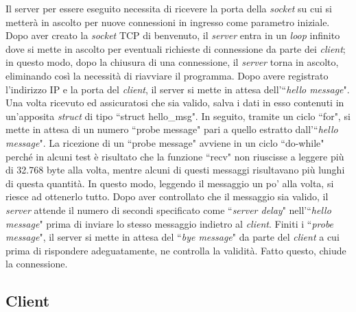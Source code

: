 \documentclass[a4paper, 12pt]{report}
\begin{document}
Il server per essere eseguito necessita di ricevere la porta della \textit{socket} su cui si metterà in ascolto per nuove connessioni in ingresso
come parametro iniziale.\newline
Dopo aver creato la \textit{socket} TCP di benvenuto, il \textit{server} entra in un \textit{loop} infinito dove si mette in ascolto per eventuali
richieste di connessione da parte dei \textit{client}; in questo modo, dopo la chiusura di una connessione, il \textit{server} torna in ascolto,
eliminando così la necessità di riavviare il programma.\newline
Dopo avere registrato l'indirizzo IP e la porta del \textit{client}, il server si mette in attesa dell'``\textit{hello message}". Una volta
ricevuto ed assicuratosi che sia valido, salva i dati in esso contenuti in un'apposita \textit{struct} di tipo ``struct hello\_msg". In seguito,
tramite un ciclo ``for", si mette in attesa di un numero ``probe message" pari a quello estratto dall'``\textit{hello message}". La ricezione di
un ``probe message" avviene in un ciclo ``do-while" perché in alcuni test è risultato che la funzione ``recv" non riuscisse a leggere più di
32.768 byte alla volta, mentre alcuni di questi messaggi risultavano più lunghi di questa quantità. In questo modo, leggendo il messaggio 
un po' alla volta, si riesce ad ottenerlo tutto. Dopo aver controllato che
il messaggio sia valido, il \textit{server} attende il numero di secondi specificato come ``\textit{server delay}" nell'``\textit{hello message}"
prima di inviare lo stesso messaggio indietro al \textit{client}.\newline
Finiti i ``\textit{probe message}", il server si mette in attesa del ``\textit{bye message}" da parte del \textit{client} a cui prima di rispondere 
adeguatamente, ne controlla la validità. Fatto questo, chiude la connessione.

\subsection{Client}
\end{document}
